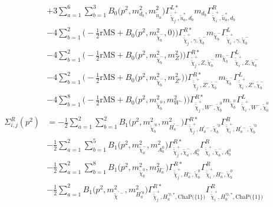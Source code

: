 \begin{itemize}
\begin{align}
 &+3 \sum_{a=1}^{6}\sum_{b=1}^{3}{B_0\Big(p^{2},m^2_{d_{{b}}},m^2_{\tilde{u}_{{a}}}\Big)} {\Gamma^{L*}_{\check{\tilde{\chi}}^+_{{j}},\tilde{u}^*_{{a}},d_{{b}}}} m_{d_{{b}}} {\Gamma^R_{\check{\tilde{\chi}}^+_{{i}},\tilde{u}^*_{{a}},d_{{b}}}}  \nonumber \\ 
 &-4 \sum_{b=1}^{2}\Big(-\frac{1}{2} \text{rMS}  + {B_0\Big(p^{2},m^2_{\tilde{\chi}^-_{{b}}},0\Big)}\Big){\Gamma^{R*}_{\check{\tilde{\chi}}^+_{{j}},\gamma,\tilde{\chi}^-_{{b}}}} m_{\tilde{\chi}^-_{{b}}} {\Gamma^L_{\check{\tilde{\chi}}^+_{{i}},\gamma,\tilde{\chi}^-_{{b}}}}  \nonumber \\ 
 &-4 \sum_{b=1}^{2}\Big(-\frac{1}{2} \text{rMS}  + {B_0\Big(p^{2},m^2_{\tilde{\chi}^-_{{b}}},m^2_{Z}\Big)}\Big){\Gamma^{R*}_{\check{\tilde{\chi}}^+_{{j}},Z,\tilde{\chi}^-_{{b}}}} m_{\tilde{\chi}^-_{{b}}} {\Gamma^L_{\check{\tilde{\chi}}^+_{{i}},Z,\tilde{\chi}^-_{{b}}}}  \nonumber \\ 
 &-4 \sum_{b=1}^{2}\Big(-\frac{1}{2} \text{rMS}  + {B_0\Big(p^{2},m^2_{\tilde{\chi}^-_{{b}}},m^2_{{Z'}}\Big)}\Big){\Gamma^{R*}_{\check{\tilde{\chi}}^+_{{j}},{Z'},\tilde{\chi}^-_{{b}}}} m_{\tilde{\chi}^-_{{b}}} {\Gamma^L_{\check{\tilde{\chi}}^+_{{i}},{Z'},\tilde{\chi}^-_{{b}}}}  \nonumber \\ 
 &-4 \sum_{b=1}^{8}\Big(-\frac{1}{2} \text{rMS}  + {B_0\Big(p^{2},m^2_{\tilde{\chi}^0_{{b}}},m^2_{W^-}\Big)}\Big){\Gamma^{R*}_{\check{\tilde{\chi}}^+_{{j}},W^-,\tilde{\chi}^0_{{b}}}} m_{\tilde{\chi}^0_{{b}}} {\Gamma^L_{\check{\tilde{\chi}}^+_{{i}},W^-,\tilde{\chi}^0_{{b}}}}  \\ 
\Sigma^R_{i,j}(p^2) &= -\frac{1}{2} \sum_{a=1}^{2}\sum_{b=1}^{2}{B_1\Big(p^{2},m^2_{\tilde{\chi}^{'0}_{{b}}},m^2_{H^{'-}_{{a}}}\Big)} {\Gamma^{R*}_{\check{\tilde{\chi}}^+_{{j}},H^{'-}_{{a}},\tilde{\chi}^{'0}_{{b}}}} {\Gamma^R_{\check{\tilde{\chi}}^+_{{i}},H^{'-}_{{a}},\tilde{\chi}^{'0}_{{b}}}}  \nonumber \\ 
 &-\frac{1}{2} \sum_{a=1}^{2}\sum_{b=1}^{5}{B_1\Big(p^{2},m^2_{\tilde{\chi}^-_{{a}}},m^2_{A^0_{{b}}}\Big)} {\Gamma^{R*}_{\check{\tilde{\chi}}^+_{{j}},\tilde{\chi}^-_{{a}},A^0_{{b}}}} {\Gamma^R_{\check{\tilde{\chi}}^+_{{i}},\tilde{\chi}^-_{{a}},A^0_{{b}}}}  \nonumber \\ 
 &-\frac{1}{2} \sum_{a=1}^{2}\sum_{b=1}^{8}{B_1\Big(p^{2},m^2_{\tilde{\chi}^0_{{b}}},m^2_{H^-_{{a}}}\Big)} {\Gamma^{R*}_{\check{\tilde{\chi}}^+_{{j}},H^-_{{a}},\tilde{\chi}^0_{{b}}}} {\Gamma^R_{\check{\tilde{\chi}}^+_{{i}},H^-_{{a}},\tilde{\chi}^0_{{b}}}}  \nonumber \\ 
 &-\frac{1}{2} \sum_{a=1}^{2}{B_1\Big(p^{2},m^2_{\tilde{\chi}^{'-}},m^2_{H^{'0}_{{a}}}\Big)} {\Gamma^{R*}_{\check{\tilde{\chi}}^+_{{j}},H^{{'0},*}_{{a}},\text{ChaP}\Big(\{1\}\Big)}} {\Gamma^R_{\check{\tilde{\chi}}^+_{{i}},H^{{'0},*}_{{a}},\text{ChaP}\Big(\{1\}\Big)}}  \nonumber \\ 

\end{align}
\end{itemize}
